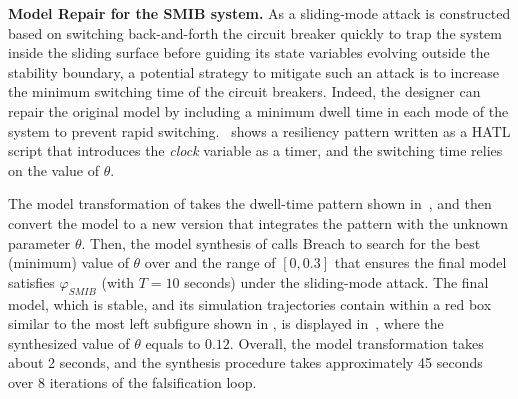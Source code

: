 \vspace{0.5em}
\noindent
{\bf Model Repair for the SMIB system.}
As a sliding-mode attack is constructed based on switching back-and-forth the circuit breaker quickly to trap the system inside the sliding surface before guiding its state variables evolving outside the stability boundary, a potential strategy to mitigate such an attack is to increase the minimum switching time of the circuit breakers. Indeed, the designer can repair the original model by including a minimum dwell time in each mode of the system to prevent rapid switching.~ shows a resiliency pattern written as a HATL script that introduces the \emph{clock} variable as a timer, and the switching time relies on the value of $\theta$.

The model transformation of \toolreaffirm takes the dwell-time pattern shown in~, and then convert the model to a new version that integrates the pattern with the unknown parameter $\theta$.
%
Then, the model synthesis of \toolreaffirm calls Breach to search for the best (\ie minimum) value of $\theta$ over and the range of $[0, 0.3]$ that ensures the final model satisfies $\varphi_{SMIB}$ (with $T = 10$ seconds) under the sliding-mode attack. The final model, which is stable, and its simulation trajectories contain within a red box similar to the most left subfigure shown in , is displayed in~, where the synthesized value of $\theta$ equals to $0.12$. Overall, the model transformation takes about 2 seconds, and the synthesis procedure takes approximately 45 seconds over 8 iterations of the falsification loop.




